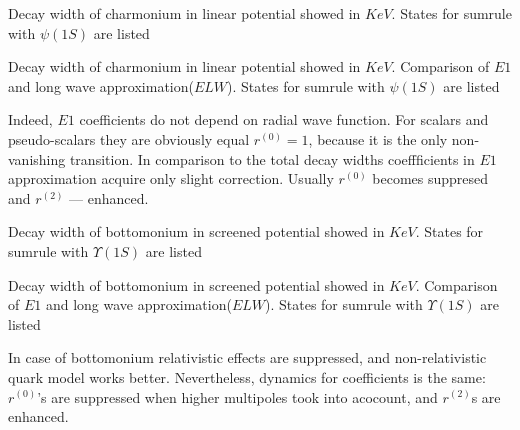 \begin{table}[H]
    \centering
    \caption{Decay width of charmonium in linear potential showed in $KeV$. States for sumrule with $\psi(1S)$ are listed \label{tab:width:psi_1S.c-lin}}
    \begin{footnotesize}
        
    \end{footnotesize}
\end{table}

\begin{table}[H]
    \centering
    \caption{Decay width of charmonium in linear potential showed in $KeV$. Comparison of $E1$ and long wave approximation($ELW$). States for sumrule with $\psi(1S)$ are listed \label{tab:width:ELW.psi_1S.c-lin}}
    \begin{footnotesize}
        
    \end{footnotesize}
\end{table}

Indeed, $E1$ coefficients do not depend on radial wave function. For scalars and pseudo-scalars they are obviously equal $r^{(0)}=1$, because it is the only non-vanishing transition. In comparison to the total decay widths coeffficients in $E1$ approximation acquire only slight correction. Usually $r^{(0)}$ becomes suppresed and $r^{(2)}$ --- enhanced.

\begin{table}[H]
    \centering
    \caption{Decay width of bottomonium in screened potential showed in $KeV$. States for sumrule with $\Upsilon(1S)$ are listed \label{tab:width:yps_1S.b-scr}}
    \begin{footnotesize}
        
    \end{footnotesize}
\end{table}

\begin{table}[H]
    \centering
    \caption{Decay width of bottomonium in screened potential showed in $KeV$. Comparison of $E1$ and long wave approximation($ELW$). States for sumrule with $\Upsilon(1S)$ are listed \label{tab:width:ELW.yps_1S.b-scr}}
    \begin{footnotesize}
        
    \end{footnotesize}
\end{table}

In case of bottomonium relativistic effects are suppressed, and non-relativistic quark model works better. Nevertheless, dynamics for coefficients is the same: $r^{(0)}$'s are suppressed when higher multipoles took into acocount, and $r^{(2)}$s are enhanced.

